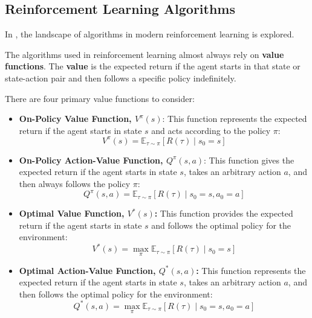 \subsection{Reinforcement Learning Algorithms}
\label{sec:rlalg}

In \cite{openaiPartKinds}, the landscape of algorithms in modern reinforcement
learning is explored.

The algorithms used in reinforcement learning almost always rely on
\textbf{value functions}.
The \textbf{value} is the expected return if the agent starts in
that state or state-action pair and then follows a specific policy indefinitely.

\vspace{5cm}

There are four primary value functions to consider:

\begin{itemize}
    \item \textbf{On-Policy Value Function, \( V^{\pi}(s) \)}: This function
    represents the expected return if the agent starts in state \( s \)
    and acts according to the policy \( \pi \):
    \begin{equation}
    V^{\pi}(s) = \mathbb{E}_{\tau \sim \pi} \left[ R(\tau) \mid s_0 = s \right]
    \end{equation}
    \item \textbf{On-Policy Action-Value Function, \( Q^{\pi}(s,a) \)}:
    This function gives the expected return if the agent starts in state \( s \),
    takes an arbitrary action \( a \), and then always follows the policy \( \pi \):
    \begin{equation}
    Q^{\pi}(s,a) = \mathbb{E}_{\tau \sim \pi} \left[ R(\tau) \mid s_0 = s, a_0 = a \right]
    \end{equation}
    \item \textbf{Optimal Value Function, \( V^*(s) \):} This function provides
    the expected return if the agent starts in state \( s \) and follows the
    optimal policy for the environment:
    \begin{equation}
    V^*(s) = \max_{\pi} \mathbb{E}_{\tau \sim \pi} \left[ R(\tau) \mid s_0 = s \right]
    \end{equation}
    \item \textbf{Optimal Action-Value Function, \( Q^*(s,a) \):} This function
    represents the expected return if the agent starts in state \( s \),
    takes an arbitrary action \( a \), and then follows the optimal policy for the environment:
    \begin{equation}
    Q^*(s,a) = \max_{\pi} \mathbb{E}_{\tau \sim \pi} \left[ R(\tau) \mid s_0 = s, a_0 = a \right]
    \end{equation}
\end{itemize}

